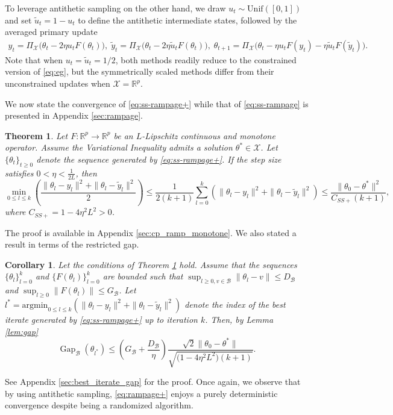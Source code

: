 \documentclass[letter,11pt]{article}
\newtheorem{theorem}{Theorem}[]
\newtheorem{corollary}{Corollary}[theorem]
\begin{document}
To leverage antithetic sampling on the other hand, we draw $u_t \sim \mathrm{Unif}([0,1])$ and set $\tilde{u}_t=1-u_t$ to define the antithetic intermediate states, followed by the averaged primary update
\begin{equation}\label{eq:ss-rampage+}
\tag{SS-RAMPAGE+}
\begin{aligned}
y_t = \Pi_{\mathcal{X}}\big(\theta_t - 2\eta u_t F(\theta_t)\big), \;
\tilde{y}_t = \Pi_{\mathcal{X}}\big(\theta_t - 2\eta \tilde{u}_t F(\theta_t)\big), \;
\theta_{t+1} = \Pi_{\mathcal{X}}\big(\theta_t - \eta u_t F(y_t) - \eta \tilde{u}_t F(\tilde{y}_t)\big).
\end{aligned}
\end{equation}
Note that when $u_t = \tilde{u}_t = 1/2$, both methods readily reduce to the constrained version of \eqref{eq:eg}, but the symmetrically scaled methods differ from their unconstrained updates when $\mathcal{X}=\mathbb{R}^p$. 

We now state the convergence of \eqref{eq:ss-rampage+} while that of \eqref{eq:ss-rampage} is presented in Appendix \ref{sec:rampage}.
\begin{theorem} \label{thm:cp_ramp_monotone}
Let $F: \mathbb{R}^p \to \mathbb{R}^p$ be an $L$-Lipschitz continuous and monotone operator. Assume the Variational Inequality admits a solution $\theta^* \in \mathcal{X}$. Let $\{\theta_t\}_{t \ge 0}$ denote the sequence generated by \eqref{eq:ss-rampage+}. If the step size satisfies $0 < \eta < \frac{1}{2L}$, then
\begin{equation}
\min_{0 \le l \le k} \left( \frac{\|\theta_l - y_l\|^2 + \|\theta_l - \tilde{y}_l\|^2}{2} \right) \le \frac{1}{2(k+1)} \sum_{l=0}^k \left( \|\theta_l - y_l\|^2 + \|\theta_l - \tilde{y}_l\|^2 \right) \le \frac{\|\theta_0 - \theta^*\|^2}{C_{SS+} (k+1)},
\end{equation}
where $C_{SS+} = 1 - 4\eta^2 L^2 > 0$.
\end{theorem}
The proof is available in Appendix \ref{sec:cp_ramp_monotone}. We also stated a result in terms of the restricted gap.
\begin{corollary} \label{cor:best_iterate_gap}
Let the conditions of Theorem \ref{thm:cp_ramp_monotone} hold. Assume that the sequences $\{\theta_l\}_{l=0}^k$ and $\{F(\theta_l)\}_{l=0}^k$ are bounded such that $\sup_{l \ge 0, v \in \mathcal{B}} \|\theta_l - v\| \le D_{\mathcal{B}}$ and $\sup_{l \ge 0} \|F(\theta_l)\| \le G_{\mathcal{B}}$. Let $l^* = \mathrm{argmin}_{0 \le l \le k} \left( \|\theta_l - y_l\|^2 + \|\theta_l - \tilde{y}_l\|^2 \right)$ denote the index of the best iterate generated by \eqref{eq:ss-rampage+} up to iteration $k$. Then, by Lemma \ref{lem:gap}
\begin{equation}
\operatorname{Gap}_{\mathcal{B}}(\theta_{l^*}) \le \left( G_{\mathcal{B}} + \frac{D_{\mathcal{B}}}{\eta} \right) \frac{\sqrt{2}\|\theta_0 - \theta^*\|}{\sqrt{\big(1 - 4\eta^2 L^2\big)(k+1)}}.
\end{equation}
\end{corollary}
See Appendix \ref{sec:best_iterate_gap} for the proof. Once again, we observe that by using antithetic sampling, \eqref{eq:rampage+} enjoys a purely deterministic convergence despite being a randomized algorithm.
\end{document}

